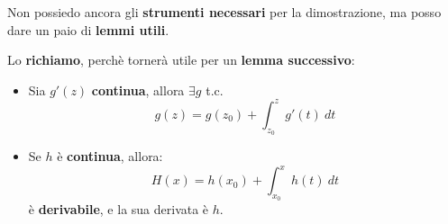 \documentclass[a4paper, oneside]{article}
\begin{document}
    \noindent Non possiedo ancora gli \textbf{strumenti necessari} per la dimostrazione, ma posso dare un paio di \textbf{lemmi utili}.

    \begin{lemma}
        Lo \textbf{richiamo}, perchè tornerà utile per un \textbf{lemma successivo}:
        \begin{itemize}
            \item Sia $g'(z)$ \textbf{continua}, allora $\exists g$ t.c.
            \[g(z) = g(z_0) + \int_{z_0}^{z} g'(t) \ dt\]
            \item Se $h$ è \textbf{continua}, allora:
            \[H(x) = h(x_0) + \int_{x_0}^{x} h(t)\ dt\]\noindent
            è \textbf{derivabile}, e la sua derivata è $h$.
        \end{itemize}
    \end{lemma}
\end{document}
